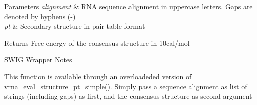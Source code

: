 \begin{DoxyParams}{Parameters}
{\em alignment} & R\+NA sequence alignment in uppercase letters. Gaps are denoted by hyphens (\textquotesingle{}-\/\textquotesingle{}) \\
\hline
{\em pt} & Secondary structure in pair table format \\
\hline
\end{DoxyParams}
\begin{DoxyReturn}{Returns}
Free energy of the consensus structure in 10cal/mol
\end{DoxyReturn}
\begin{DoxyRefDesc}{S\+W\+I\+G Wrapper Notes}
\item[\mbox{\hyperlink{wrappers__wrappers000072}{S\+W\+I\+G Wrapper Notes}}]This function is available through an overloadeded version of \mbox{\hyperlink{group__eval_ga0bba59b4d6e53461088666ff4aece7b0}{vrna\+\_\+eval\+\_\+structure\+\_\+pt\+\_\+simple()}}. Simply pass a sequence alignment as list of strings (including gaps) as first, and the consensus structure as second argument \end{DoxyRefDesc}
